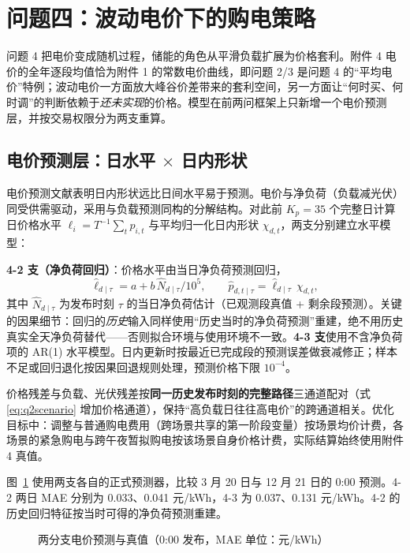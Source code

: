 \section{问题四：波动电价下的购电策略}
问题 4 把电价变成随机过程，储能的角色从平滑负载扩展为价格套利\cite{hejazi}。附件 4 电价的全年逐段均值恰为附件 1 的常数电价曲线，即问题 2/3 是问题 4 的“平均电价”特例；波动电价一方面放大峰谷价差带来的套利空间，另一方面让“何时买、何时调”的判断依赖于\emph{还未实现}的价格。模型在前两问框架上只新增一个电价预测层，并按交易权限分为两支重算。

\subsection{电价预测层：日水平 $\times$ 日内形状}
电价预测文献\cite{weron}表明日内形状远比日间水平易于预测。电价与净负荷（负载减光伏）同受供需驱动，采用与负载预测同构的分解结构。对此前 $K_p=35$ 个完整日计算日价格水平 $\ell_i=T^{-1}\sum_tp_{i,t}$ 与平均归一化日内形状 $\chi_{d,t}$，两支分别建立水平模型：

\textbf{4-2 支（净负荷回归）}：价格水平由当日净负荷预测回归，
\begin{equation}
\hat\ell_{d\mid\tau}=a+b\,\widehat N_{d\mid\tau}/10^5,\qquad
\hat p_{d,t\mid\tau}=\hat\ell_{d\mid\tau}\,\chi_{d,t},
\label{eq:q4price}
\end{equation}
其中 $\widehat N_{d\mid\tau}$ 为发布时刻 $\tau$ 的当日净负荷估计（已观测段真值 + 剩余段预测）。关键的因果细节：回归的\emph{历史}输入同样使用“历史当时的净负荷预测”重建，绝不用历史真实全天净负荷替代——否则拟合环境与使用环境不一致。\textbf{4-3 支}使用不含净负荷项的 AR(1) 水平模型。日内更新时按最近已完成段的预测误差做衰减修正；样本不足或回归退化按因果回退规则处理，预测价格下限 $10^{-4}$。

价格残差与负载、光伏残差按\textbf{同一历史发布时刻的完整路径}三通道配对（式\eqref{eq:q2scenario} 增加价格通道），保持“高负载日往往高电价”的跨通道相关。优化目标中：调整与普通购电费用（跨场景共享的第一阶段变量）按场景均价计费，各场景的紧急购电与跨午夜暂拟购电按该场景自身价格计费，实际结算始终使用附件 4 真值。

图~\ref{fig:fig_f10_price_forecast} 使用两支各自的正式预测器，比较 3 月 20 日与 12 月 21 日的 0:00 预测。4-2 两日 MAE 分别为 0.033、0.041 元/kWh，4-3 为 0.037、0.131 元/kWh。4-2 的历史回归特征按当时可得的净负荷预测重建。

\begin{figure}[!htbp]\centering
{}
\caption{两分支电价预测与真值（0:00 发布，MAE 单位：元/kWh）}\label{fig:fig_f10_price_forecast}
\end{figure}

